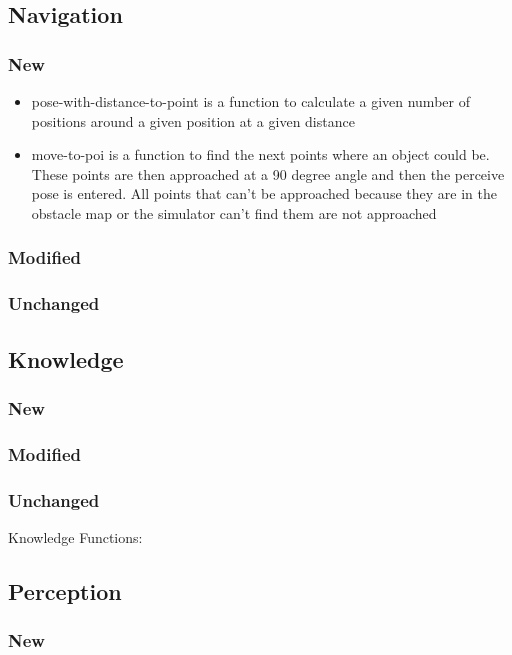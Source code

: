 \documentclass[main.tex]{subfiles}
\begin{document}
                \subsection{Navigation}
                \subsubsection{New}
                \begin{itemize}
 				 \item pose-with-distance-to-point is a function to calculate a given number of positions around a given position at a given distance
 				 \item move-to-poi is a function to find the next points where an object could be. These points are then approached at a 90 degree angle and then the perceive pose is entered. All points that can't be approached because they are in the obstacle map or the simulator can't find them are not approached
				\end{itemize}
                \subsubsection{Modified}
                \subsubsection{Unchanged}
                
                \subsection{Knowledge}
                \subsubsection{New}
                \subsubsection{Modified}
                \subsubsection{Unchanged}Knowledge Functions:
                
                \subsection{Perception}
                \subsubsection{New}
\end{document}
